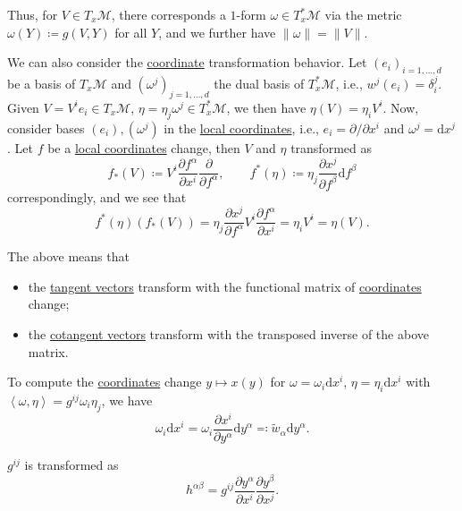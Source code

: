 Thus, for \(V\in T_x \mathcal{M} \), there corresponds a \(1\)-form \(\omega \in T_x ^{\ast} \mathcal{M} \) via the metric \(\omega (Y) \coloneqq g(V, Y)\) for all \(Y\), and we further have \(\lVert \omega \rVert = \lVert V \rVert \).

We can also consider the \hyperref[def:local-coordinate]{coordinate} transformation behavior. Let \((e_i)_{i=1, \ldots , d}\) be a basis of \(T_x \mathcal{M} \) and \((\omega ^j)_{j=1, \ldots , d}\) the dual basis of \(T_x ^{\ast} \mathcal{M} \), i.e., \(w^j(e_i)=\delta _i^j\). Given \(V = V^i e_i \in T_x \mathcal{M} \), \(\eta =\eta _j \omega ^j \in T_x^{\ast} \mathcal{M} \), we then have \(\eta (V) = \eta _i V^i\). Now, consider bases \((e_i), (\omega ^j)\) in the \hyperref[def:coordinate-chart]{local coordinates}, i.e., \(e_i = \partial / \partial x^i\) and \(\omega ^j = \mathrm{d} x^j\). Let \(f\) be a \hyperref[def:coordinate-chart]{local coordinates} change, then \(V\) and \(\eta \) transformed as
\[
	f_{\ast }(V) \coloneqq V^i \frac{\partial f^\alpha }{\partial x^i} \frac{\partial }{\partial f^\alpha },\qquad
	f^{\ast} (\eta ) \coloneqq \eta _j \frac{\partial x^j}{\partial f^\beta } \mathrm{d} f^\beta
\]
correspondingly, and we see that
\[
	f^{\ast} (\eta )(f_{\ast } (V))
	= \eta _j \frac{\partial x^j}{\partial f^\alpha } V^i \frac{\partial f^\alpha }{\partial x^i}
	= \eta _i V^i = \eta (V).
\]

\begin{intuition}
	The above means that
	\begin{itemize}
		\item the \hyperref[def:tangent-vector]{tangent vectors} transform with the functional matrix of \hyperref[def:coordinate-chart]{coordinates} change;
		\item the \hyperref[def:cotangent-vector]{cotangent vectors} transform with the transposed inverse of the above matrix.
	\end{itemize}
\end{intuition}

To compute the \hyperref[def:coordinate-chart]{coordinates} change \(y \mapsto x(y)\) for \(\omega = \omega _i \mathrm{d} x^i\), \(\eta = \eta _i \mathrm{d} x^i\) with \(\left\langle \omega , \eta \right\rangle = g^{ij} \omega _i \eta _j\), we have
\[
	\omega _i \mathrm{d} x^i
	= \omega _i \frac{\partial x^i}{\partial y^\alpha } \mathrm{d} y^\alpha
	\eqqcolon \widetilde{w} _\alpha \mathrm{d} y^\alpha.
\]

\begin{prev}
	\(g^{ij} \) is transformed as
	\[
		h^{\alpha \beta } = g^{ij} \frac{\partial y^\alpha }{\partial x^i} \frac{\partial y^\beta }{\partial x^j}.
	\]
\end{prev}

